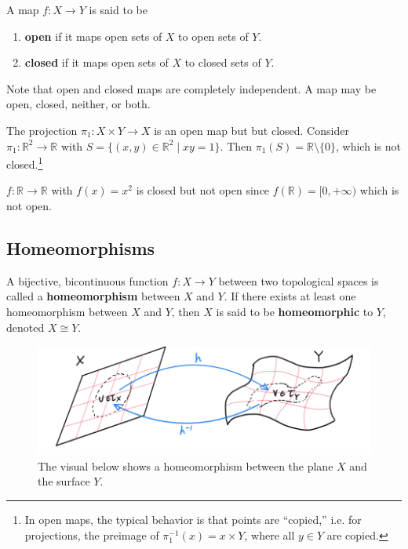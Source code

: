   \begin{definition}
    A map $f: X \rightarrow Y$ is said to be 
    \begin{enumerate}
      \item \textbf{open} if it maps open sets of $X$ to open sets of $Y$. 
      \item \textbf{closed} if it maps open sets of $X$ to closed sets of $Y$. 
    \end{enumerate}
    Note that open and closed maps are completely independent. A map may be open, closed, neither, or both. 
  \end{definition}

  \begin{example}
    The projection $\pi_1: X \times Y \rightarrow X$ is an open map but but closed. Consider $\pi_1: \mathbb{R}^2 \rightarrow \mathbb{R}$ with $S = \{(x, y) \in \mathbb{R}^2 \mid xy = 1 \}$. Then $\pi_1 (S) = \mathbb{R} \setminus \{0\}$, which is not closed.\footnote{In open maps, the typical behavior is that points are ``copied,'' i.e. for projections, the preimage of $\pi_1^{-1} (x) = x \times Y$, where all $y \in Y$ are copied.}
  \end{example}

  \begin{example}
    $f: \mathbb{R} \rightarrow \mathbb{R}$ with $f(x) = x^2$ is closed but not open since $f(\mathbb{R}) = [0, +\infty)$ which is not open. 
  \end{example}

\subsection{Homeomorphisms}

  \begin{definition}[Homeomorphism]
    A bijective, bicontinuous function $f: X \longrightarrow Y$ between two topological spaces is called a \textbf{homeomorphism} between $X$ and $Y$. If there exists at least one homeomorphism between $X$ and $Y$, then $X$ is said to be \textbf{homeomorphic} to $Y$, denoted $X \cong Y$. 

    \begin{figure}[H]
      \centering 
      \includegraphics[scale=0.4]{img/Homeomorphism_of_Plane.png}
      \caption{The visual below shows a homeomorphism between the plane $X$ and the surface $Y$.}
      \label{fig:homeomorphism_plane}
    \end{figure}
  \end{definition}

